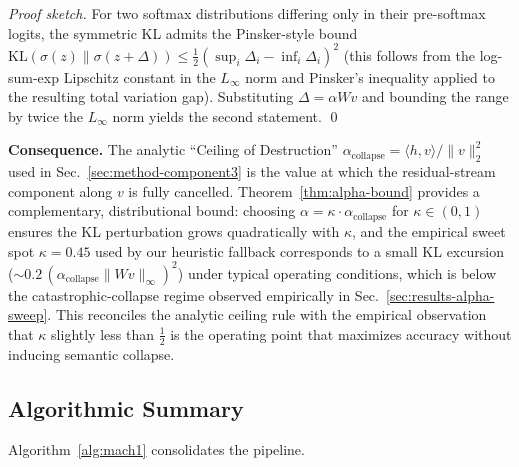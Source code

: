 \documentclass[conference]{IEEEtran}
\begin{document}
\begin{proof}[Proof sketch]
For two softmax distributions differing only in their pre-softmax logits, the symmetric KL admits the Pinsker-style bound $\mathrm{KL}(\sigma(z) \| \sigma(z+\Delta)) \leq \tfrac{1}{2}(\sup_i \Delta_i - \inf_i \Delta_i)^2$ (this follows from the log-sum-exp Lipschitz constant in the $L_\infty$ norm and Pinsker's inequality applied to the resulting total variation gap). Substituting $\Delta = \alpha W v$ and bounding the range by twice the $L_\infty$ norm yields the second statement. \qed
\end{proof}

\textbf{Consequence.} The analytic ``Ceiling of Destruction'' $\alpha_{\text{collapse}} = \langle h, v\rangle / \|v\|_2^2$ used in Sec.~\ref{sec:method-component3} is the value at which the residual-stream component along $v$ is fully cancelled. Theorem~\ref{thm:alpha-bound} provides a complementary, distributional bound: choosing $\alpha = \kappa \cdot \alpha_{\text{collapse}}$ for $\kappa \in (0, 1)$ ensures the KL perturbation grows quadratically with $\kappa$, and the empirical sweet spot $\kappa = 0.45$ used by our heuristic fallback corresponds to a small KL excursion ($\sim 0.2 \, (\alpha_{\text{collapse}} \|Wv\|_\infty)^2$) under typical operating conditions, which is below the catastrophic-collapse regime observed empirically in Sec.~\ref{sec:results-alpha-sweep}. This reconciles the analytic ceiling rule with the empirical observation that $\kappa$ slightly less than $\tfrac{1}{2}$ is the operating point that maximizes accuracy without inducing semantic collapse.

\subsection{Algorithmic Summary}

Algorithm~\ref{alg:mach1} consolidates the pipeline.
\end{document}
